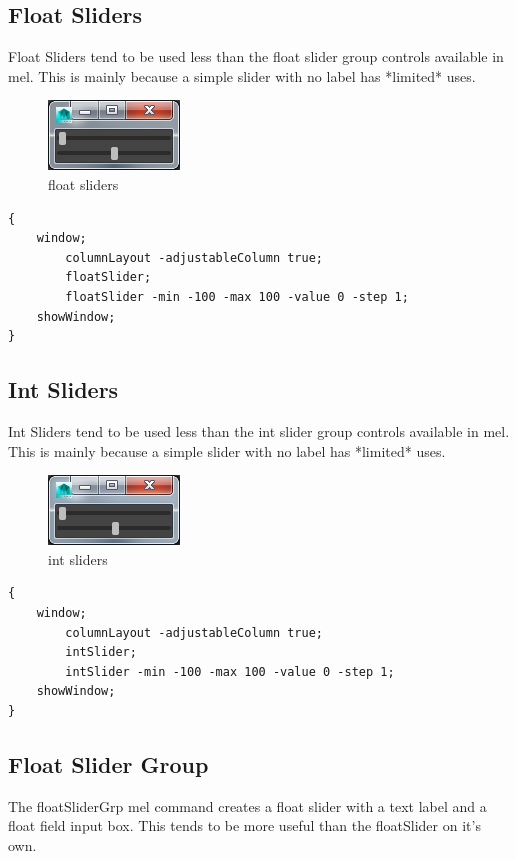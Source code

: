 \subsection{Float Sliders}
Float Sliders tend to be used less than the float slider group controls available in mel. This is mainly because a simple slider with no label has *limited* uses.

\begin{figure}[tbh]
	\centering
	\includegraphics[width=0.2\linewidth]{figures/GUI/floatSliders}
	\caption{float sliders}
	\label{fig:floatsliders}
\end{figure}

\begin{lstlisting}
{
	window;
		columnLayout -adjustableColumn true;
		floatSlider;
		floatSlider -min -100 -max 100 -value 0 -step 1;
	showWindow;
}
\end{lstlisting}

\subsection{Int Sliders}
Int Sliders tend to be used less than the int slider group controls available in mel. This is mainly because a simple slider with no label has *limited* uses.

\begin{figure}[tbh]
	\centering
	\includegraphics[width=0.2\linewidth]{figures/GUI/intSliders}
	\caption{int sliders}
	\label{fig:intsliders}
\end{figure}

\begin{lstlisting}
{
	window;
		columnLayout -adjustableColumn true;
		intSlider;
		intSlider -min -100 -max 100 -value 0 -step 1;
	showWindow;
}
\end{lstlisting}

\subsection{Float Slider Group}
The floatSliderGrp mel command creates a float slider with a text label and a float field input box. This tends to be more useful than the floatSlider on it's own.

